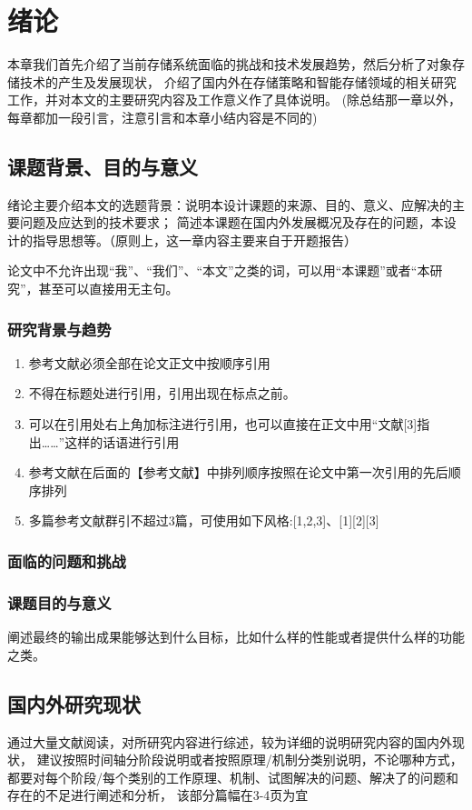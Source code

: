 \section{绪\hspace{1em}论}
本章我们首先介绍了当前存储系统面临的挑战和技术发展趋势，然后分析了对象存储技术的产生及发展现状，
介绍了国内外在存储策略和智能存储领域的相关研究工作，并对本文的主要研究内容及工作意义作了具体说明。
(除总结那一章以外，每章都加一段引言，注意引言和本章小结内容是不同的)

\subsection{课题背景、目的与意义}
绪论主要介绍本文的选题背景：说明本设计课题的来源、目的、意义、应解决的主要问题及应达到的技术要求；
简述本课题在国内外发展概况及存在的问题，本设计的指导思想等。（原则上，这一章内容主要来自于开题报告）

论文中不允许出现“我”、“我们”、“本文”之类的词，可以用“本课题”或者“本研究”，甚至可以直接用无主句。

\subsubsection{研究背景与趋势}
\begin{enumerate}
    \item 参考文献必须全部在论文正文中按顺序引用
    \item 不得在标题处进行引用，引用出现在标点之前。
    \item 可以在引用处右上角加标注进行引用，也可以直接在正文中用“文献[3]指出……”这样的话语进行引用
    \item 参考文献在后面的【参考文献】中排列顺序按照在论文中第一次引用的先后顺序排列
    \item 多篇参考文献群引不超过3篇，可使用如下风格:[1,2,3]、[1][2][3]
\end{enumerate}

\subsubsection{面临的问题和挑战}

\subsubsection{课题目的与意义}

阐述最终的输出成果能够达到什么目标，比如什么样的性能或者提供什么样的功能之类。

\subsection{国内外研究现状}
通过大量文献阅读，对所研究内容进行综述，较为详细的说明研究内容的国内外现状，
建议按照时间轴分阶段说明或者按照原理/机制分类别说明，不论哪种方式，
都要对每个阶段/每个类别的工作原理、机制、试图解决的问题、解决了的问题和存在的不足进行阐述和分析，
该部分篇幅在3-4页为宜

